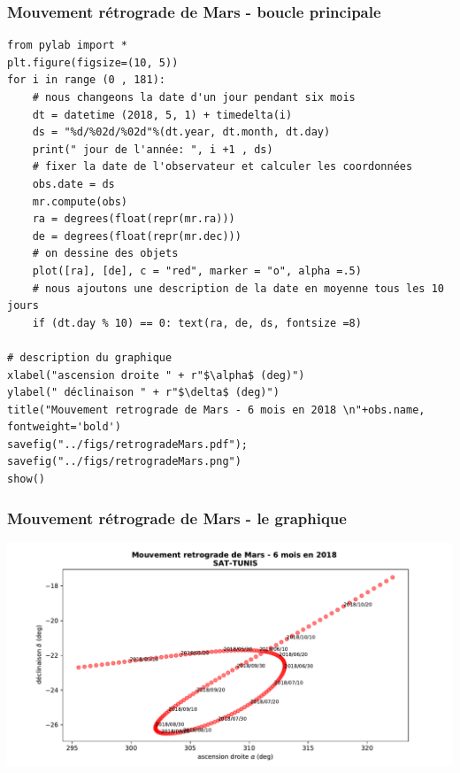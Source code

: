 \documentclass{beamer}
\begin{document}
\begin{frame}
\frametitle{Mouvement rétrograde de Mars - boucle principale}

\begin{verbatim}
from pylab import *
plt.figure(figsize=(10, 5))
for i in range (0 , 181):
    # nous changeons la date d'un jour pendant six mois
    dt = datetime (2018, 5, 1) + timedelta(i)
    ds = "%d/%02d/%02d"%(dt.year, dt.month, dt.day)
    print(" jour de l'année: ", i +1 , ds)
    # fixer la date de l'observateur et calculer les coordonnées
    obs.date = ds
    mr.compute(obs)
    ra = degrees(float(repr(mr.ra)))
    de = degrees(float(repr(mr.dec)))
    # on dessine des objets
    plot([ra], [de], c = "red", marker = "o", alpha =.5)
    # nous ajoutons une description de la date en moyenne tous les 10 jours
    if (dt.day % 10) == 0: text(ra, de, ds, fontsize =8)

# description du graphique
xlabel("ascension droite " + r"$\alpha$ (deg)")
ylabel(" déclinaison " + r"$\delta$ (deg)")
title("Mouvement retrograde de Mars - 6 mois en 2018 \n"+obs.name, fontweight='bold')
savefig("../figs/retrogradeMars.pdf"); savefig("../figs/retrogradeMars.png")
show()
\end{verbatim}
\end{frame}

\begin{frame}
\frametitle{Mouvement rétrograde de Mars - le graphique}

\vspace{6mm}

\centerline{\includegraphics[width=0.9\linewidth]{figs/retrogradeMars1.pdf}}

\vspace{6mm}
\end{frame}
\end{document}

